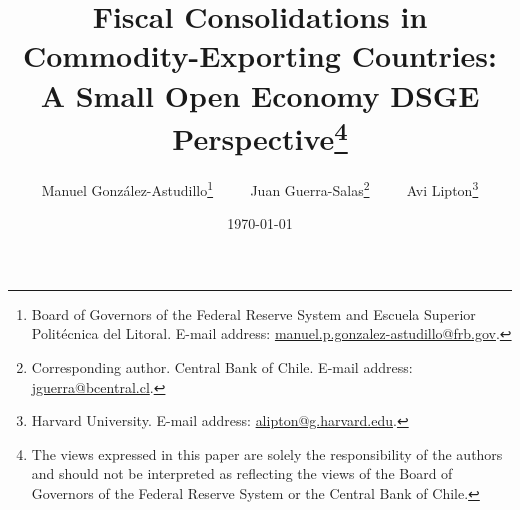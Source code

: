 \documentclass[12pt]{article}
\begin{document}
\title{Fiscal Consolidations in Commodity-Exporting Countries: A Small Open Economy DSGE Perspective\thanks{The views expressed in this paper are solely the responsibility of the authors and should not be interpreted as reflecting the views of the Board of Governors of the Federal Reserve System or the Central Bank of Chile.}}

\author{
Manuel González-Astudillo\thanks{Board of Governors of the Federal Reserve System and Escuela Superior Polit\'ecnica del Litoral. E-mail address: \url{manuel.p.gonzalez-astudillo@frb.gov}.}
$\qquad$
Juan Guerra-Salas\thanks{Corresponding author. Central Bank of Chile. E-mail address: \url{jguerra@bcentral.cl}.}
$\qquad$
Avi Lipton\thanks{Harvard University. E-mail address: \url{alipton@g.harvard.edu}.}
}

\date{\today}
\maketitle
\end{document}
